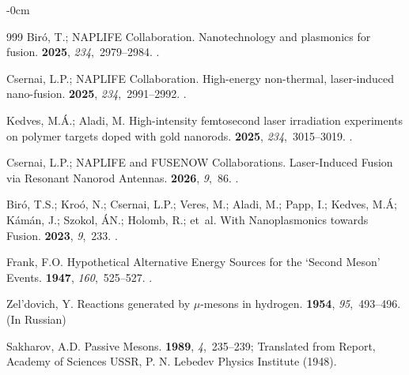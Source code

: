 \documentclass[particles,article,accept,pdftex,moreauthors]{Definitions/mdpi}
\begin{document}
\begin{adjustwidth}{-\extralength}{0cm}
\begin{thebibliography}{999}
Bir{\'o}, T.; {NAPLIFE Collaboration}.
\newblock Nanotechnology and plasmonics for fusion.
 {\bf 2025}, {\em 234},~2979--2984.
.

Csernai, L.P.; {NAPLIFE Collaboration}.
\newblock High-energy non-thermal, laser-induced nano-fusion.
 {\bf 2025}, {\em 234},~2991--2992.
.

Kedves, M.{\'A}.;  Aladi, M.
\newblock High-intensity femtosecond laser irradiation experiments on polymer
  targets doped with gold nanorods.
 {\bf 2025}, {\em 234},~3015--3019.
.

Csernai, L.P.; {NAPLIFE and FUSENOW Collaborations}.
\newblock Laser-Induced Fusion via Resonant Nanorod Antennas.
 {\bf 2026}, {\em 9},~86.
.

Bir{\'o}, T.S.; Kro{\'o}, N.;  Csernai, L.P.; Veres, M.; Aladi, M.; Papp, I.; Kedves, M.Á; Kámán, J.; Szokol, ÁN.; Holomb, R.; et~al.
\newblock With Nanoplasmonics towards Fusion.
 {\bf 2023}, {\em 9},~233.
.

Frank, F.O.
\newblock Hypothetical Alternative Energy Sources for the ‘Second Meson’
  Events.
 {\bf 1947}, {\em 160},~525–527.
.

Zel'dovich, Y.
\newblock Reactions generated by $\mu$-mesons in hydrogen.
 {\bf 1954}, {\em 95},~493--496. (In Russian)

Sakharov, A.D.
\newblock Passive Mesons.
 {\bf 1989}, {\em 4},~235--239;
\newblock Translated from Report, Academy of Sciences USSR, P. N. Lebedev
  Physics Institute (1948).


\end{thebibliography}
\end{adjustwidth}
\end{document}
